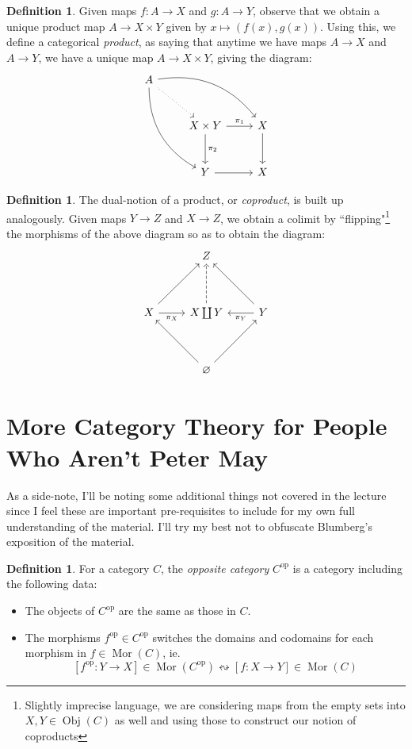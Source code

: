 \documentclass[leqno, openany]{memoir}
\theoremstyle{definition}
\newtheorem{defn}[thm]{Definition}
\theoremstyle{remark}
\theoremstyle{plain}
\theoremstyle{definition}
\theoremstyle{remark}
\newcommand{\opp}{^\text{op}}
\DeclareMathOperator{\Obj}{Obj}
\DeclareMathOperator{\Mor}{Mor}
\begin{document}
\begin{defn}
    Given maps $f: A \to X$ and $g: A \to Y$, observe that we obtain a unique product map $A \to X \times Y$ given by $x \mapsto (f(x), g(x))$. Using this, we define a categorical \emph{product}, as saying that anytime we have maps $A \to X$ and $A \to Y$, we have a unique map $A \to X \times Y$, giving the diagram:
    \[\begin{tikzcd}[row sep = large]
A \arrow[drr, bend left] \arrow[ddr, bend right] \arrow[dr, dotted, description] & & \\ & X \times Y \arrow[r, "\pi_1"] \arrow[d, "\pi_2"] & X \arrow[d] \\ & Y \arrow[r] & X
\end{tikzcd}\]
\end{defn}

\begin{defn}
    The dual-notion of a product, or \emph{coproduct}, is built up analogously. Given maps $Y \to Z$ and $X \to Z$, we obtain a colimit by ``flipping"\footnote{Slightly imprecise language, we are considering maps from the empty sets into $X, Y \in \Obj(C)$ as well and using those to construct our notion of coproducts} the morphisms of the above diagram so as to obtain the diagram:
    \[ \begin{tikzcd}[row sep=huge]
        & Z  & \\
        X\ar[ur] \ar[r,"\pi_{X}", swap] & X \coprod Y \ar[u,dashed] & Y \ar[ul] \ar[l,"\pi_{Y}"] \\ & \varnothing \arrow[ur] \arrow[ul]&
    \end{tikzcd}
    \]
\end{defn}

\section{More Category Theory for People Who Aren't Peter May}

As a side-note, I'll be noting some additional things not covered in the lecture since I feel these are important pre-requisites to include for my own full understanding of the material. I'll try my best not to obfuscate Blumberg's exposition of the material.

\begin{defn}
For a category $C$, the \emph{opposite category} $C\opp$ is a category including the following data:
\begin{itemize}
    \item The objects of $C^{\text{op}}$ are the same as those in $C$.
    \item The morphisms $f\opp \in C\opp$ switches the domains and codomains for each morphism in $f \in \Mor(C)$, ie. 
    \[[f\opp : Y \to X] \in \Mor(C\opp)  \leftrightsquigarrow [f: X \to Y] \in \Mor(C)\]
\end{itemize}
\end{defn}
\end{document}
